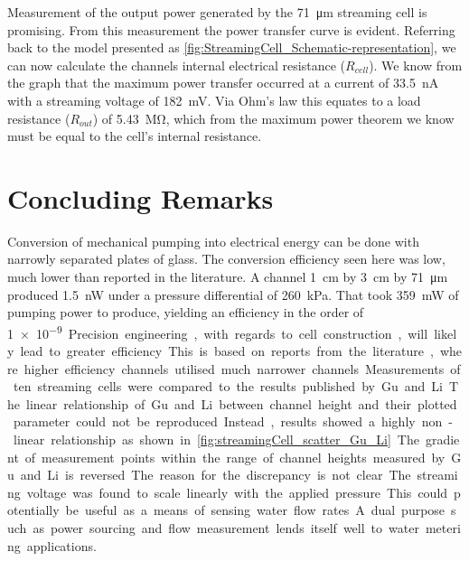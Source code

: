   Measurement of the output power generated by the \SI{71}{\micro\meter} streaming cell is promising.
  From this measurement the power transfer curve is evident.
  Referring back to the model presented as \cref{fig:StreamingCell_Schematic-representation}, we can now calculate the channels internal electrical resistance ($R_{cell}$).
  We know from the graph that the maximum power transfer occurred at a current of \SI{33.5}{\nano\ampere} with a streaming voltage of \SI{182}{\milli\volt}.
  Via Ohm's law this equates to a load resistance ($R_{out}$) of \SI{5.43}{\mega\ohm}, which from the maximum power theorem we know must be equal to the cell's internal resistance.


\section{Concluding Remarks}
  \label{sect:part1_energyHarvesting_conclusion}

  Conversion of mechanical pumping into electrical energy can be done with narrowly separated plates of glass.
  The conversion efficiency seen here was low, much lower than reported in the literature.
  A channel \SI{1}{\centi\meter} by \SI{3}{\centi\meter} by \SI{71}{\micro\meter} produced \SI{1.5}{\nano\watt} under a pressure differential of \SI{260}{\kilo\pascal}.
  That took \SI{359}{\milli\watt} of pumping power to produce, yielding an efficiency in the order of \SI{1e-9}.
  Precision engineering, with regards to cell construction, will likely lead to greater efficiency.
  This is based on reports from the literature, where higher efficiency channels utilised much narrower channels.

  Measurements of ten streaming cells were compared to the results published by Gu and Li.
  The linear relationship of Gu and Li between channel height and their plotted parameter could not be reproduced.
  Instead, results showed a highly non-linear relationship as shown in~\cref{fig:streamingCell_scatter_Gu_Li}.
  The gradient of measurement points within the range of channel heights measured by Gu and Li is reversed.
  The reason for the discrepancy is not clear.

  The streaming voltage was found to scale linearly with the applied pressure.
  This could potentially be useful as a means of sensing water flow rates.
  A dual purpose such as power sourcing and flow measurement lends itself well to water metering applications.



